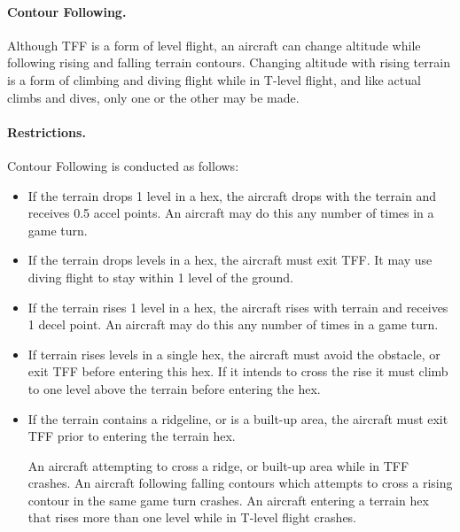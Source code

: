 \paragraph{Contour Following.} Although TFF is a form of level flight, an aircraft can change altitude while following rising and falling terrain contours.  Changing altitude with rising terrain is a form of climbing and diving flight while in T-level flight, and like actual climbs and dives, only one or the other may be made.  

\paragraph{Restrictions.} Contour Following is conducted as follows:

\begin{itemize}

    \item If the terrain drops 1 level in a hex, the aircraft drops with the terrain and receives 0.5 accel points. An aircraft may do this any number of times in a game turn.

    \item If the terrain drops  levels in a hex, the aircraft must exit TFF. It may use diving flight to stay within 1 level of the ground.
    
    \item If the terrain rises 1 level in a hex, the aircraft rises with terrain and receives 1 decel point. An aircraft may do this any number of times in a game turn.

    \item If terrain rises  levels in a single hex, the aircraft must avoid the obstacle, or exit TFF before entering this hex. If it intends to cross the rise it must climb to one level above the terrain before entering the hex.

    \item If the terrain contains a ridgeline, or is a built-up area, the aircraft must exit TFF prior to entering the terrain hex.

    An aircraft attempting to cross a ridge, or built-up area while in TFF crashes. An aircraft following falling contours which attempts to cross a rising contour in the same game turn crashes. An aircraft entering a terrain hex that rises more than one level while in T-level flight crashes.

\end{itemize}

